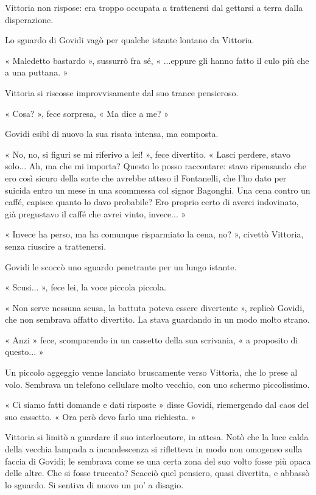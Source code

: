 Vittoria non rispose: era troppo occupata a trattenersi dal gettarsi a terra dalla disperazione.

Lo sguardo di Govidi vagò per qualche istante lontano da Vittoria.

« Maledetto bastardo », sussurrò fra sé, « ...eppure gli hanno fatto il culo più che a una puttana. »

Vittoria si riscosse improvvisamente dal suo trance pensieroso.

« Cosa? », fece sorpresa, « Ma dice a me? »

Govidi esibì di nuovo la sua risata intensa, ma composta.

« No, no, si figuri se mi riferivo a lei! », fece divertito. « Lasci perdere, stavo solo... Ah, ma che mi importa? Questo lo posso raccontare: stavo ripensando che ero così sicuro della sorte che avrebbe atteso il Fontanelli, che l'ho dato per suicida entro un mese in una scommessa col signor Bagonghi. Una cena contro un caffé, capisce quanto lo davo probabile? Ero proprio certo di averci indovinato, già pregustavo il caffé che avrei vinto, invece... »

« Invece ha perso, ma ha comunque risparmiato la cena, no? », civettò Vittoria, senza riuscire a trattenersi.

Govidi le scoccò uno sguardo penetrante per un lungo istante.

« Scusi... », fece lei, la voce piccola piccola.

« Non serve nessuna scusa, la battuta poteva essere divertente », replicò Govidi, che non sembrava affatto divertito. La stava guardando in un modo molto strano.

« Anzi » fece, scomparendo in un cassetto della sua scrivania, « a proposito di questo... »

Un piccolo aggeggio venne lanciato bruscamente verso Vittoria, che lo prese al volo. Sembrava un telefono cellulare molto vecchio, con uno schermo piccolissimo.

« Ci siamo fatti domande e dati risposte » disse Govidi, riemergendo dal caos del suo cassetto. « Ora però devo farlo una richiesta. »

Vittoria si limitò a guardare il suo interlocutore, in attesa. Notò che la luce calda della vecchia lampada a incandescenza si rifletteva in modo non omogeneo sulla faccia di Govidi; le sembrava come se una certa zona del suo volto fosse più opaca delle altre. Che si fosse truccato? Scacciò quel pensiero, quasi divertita, e abbassò lo sguardo. Si sentiva di nuovo un po' a disagio.

